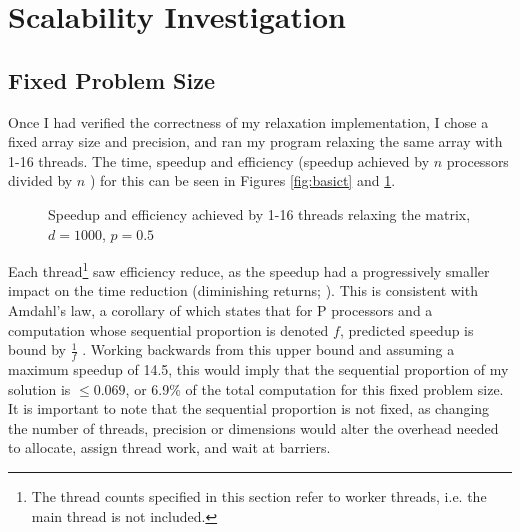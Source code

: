 \documentclass[12pt]{article}
\begin{document}
\section{Scalability Investigation}
\subsection{Fixed Problem Size}
Once I had verified the correctness of my relaxation implementation, I chose a fixed array size and precision, and ran my program relaxing the same array with 1-16 threads. The time, speedup and efficiency (speedup achieved by $n$ processors divided by $n$ \citep{speedup}) for this can be seen in Figures \ref{fig:basict} and \ref{fig:basics}. 
\begin{figure}[!htb]
    \begin{minipage}{.46\textwidth}
        \centering\caption{Time for 1-16 threads to relax the same matrix, $d=1000$, $p=0.5$}
        \label{fig:basict}
    \end{minipage}\hspace{0.4cm}
    \begin{minipage}{0.53\textwidth}
        \centering\caption{Speedup and efficiency achieved by 1-16 threads relaxing the matrix, $d=1000$, $p=0.5$}
        \label{fig:basics}
    \end{minipage}
\end{figure}

Each thread\footnote{The thread counts specified in this section refer to worker threads, i.e. the main thread is not included.} saw efficiency reduce, as the speedup had a progressively smaller impact on the time reduction (diminishing returns; \citep{Amdahl}). This is consistent with Amdahl's law, a corollary of which states that for P processors and a computation whose sequential proportion is denoted $f$, predicted speedup is bound by $\frac{1}{f}$ \citep{springer}. Working backwards from this upper bound and assuming a maximum speedup of 14.5, this would imply that the sequential proportion of my solution is $\leq 0.069$, or 6.9\% of the total computation for this fixed problem size. It is important to note that the sequential proportion is not fixed, as changing the number of threads, precision or dimensions would alter the overhead needed to allocate, assign thread work, and wait at barriers.
\end{document}
